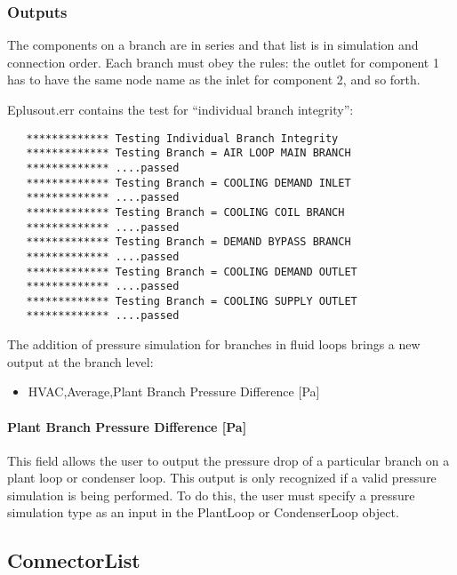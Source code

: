 \subsubsection{Outputs}\label{outputs-2-014}

The components on a branch are in series and that list is in simulation and connection order. Each branch must obey the rules: the outlet for component 1 has to have the same node name as the inlet for component 2, and so forth.

Eplusout.err contains the test for ``individual branch integrity'':

\begin{lstlisting}
   ************* Testing Individual Branch Integrity
   ************* Testing Branch = AIR LOOP MAIN BRANCH
   ************* ....passed
   ************* Testing Branch = COOLING DEMAND INLET
   ************* ....passed
   ************* Testing Branch = COOLING COIL BRANCH
   ************* ....passed
   ************* Testing Branch = DEMAND BYPASS BRANCH
   ************* ....passed
   ************* Testing Branch = COOLING DEMAND OUTLET
   ************* ....passed
   ************* Testing Branch = COOLING SUPPLY OUTLET
   ************* ....passed
\end{lstlisting}

The addition of pressure simulation for branches in fluid loops brings a new output at the branch level:

\begin{itemize}
\tightlist
\item
  HVAC,Average,Plant Branch Pressure Difference {[}Pa{]}
\end{itemize}

\paragraph{Plant Branch Pressure Difference {[}Pa{]}}\label{plant-branch-pressure-difference-pa}

This field allows the user to output the pressure drop of a particular branch on a plant loop or condenser loop. This output is only recognized if a valid pressure simulation is being performed. To do this, the user must specify a pressure simulation type as an input in the PlantLoop or CondenserLoop object.

\subsection{ConnectorList}\label{connectorlist}

